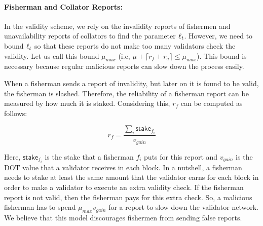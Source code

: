 \paragraph{Fisherman and Collator Reports:} In the validity scheme, we rely on the invalidity reports of fishermen and unavailability reports of collators to find the parameter $ \ell_t $. However, we need to bound $\ell_t$ so that these reports do not make too many validators check the validity. Let us call this bound $\mu_{max}$ (i.e, $\mu + \lceil r_f + r_a \rceil \leq \mu_{max}$). This bound is necessary because regular malicious reports can slow down the process easily. 

When a fisherman sends a report of invalidity, but later on it is found to be valid, the fisherman is slashed. Therefore, the reliability of a fisherman report can be measured by how much it is staked. 
Considering this, $r_f$ can be computed as follows:

$$r_f = \frac{\sum_{i}\mathsf{stake}_{f_i}}{v_{gain}}$$

Here, $\mathsf{stake}_{f_i}$ is the stake that a fisherman $f_i$ puts for this report and $v_{gain}$ is the DOT value that a validator receives in each block. In a nutshell, a fisherman needs to stake at least the same amount that the validator earns for each block in order to make a validator to execute an extra validity check. If the fisherman report is not valid, then the fisherman pays for this extra check. So, a malicious fisherman has to spend $\mu_{max} v_{gain}$ for a report to slow down the validator network. We believe that this model discourages fishermen from sending false reports. 

